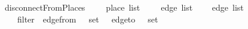 \ disconnectFromPlaces\ {\isacharcolon}{\isacharcolon}\ {\isachardoublequoteopen}{\isacharparenleft}\ \ \ place\ list\ {\isasymRightarrow}\ {\isacharparenleft}\ \ \ edge\ list\isanewline
{}\ {\isacharparenleft}\ \ \ edge\ list{\isachardoublequoteclose}\isanewline
\ \ \ {\isachardoublequoteopen}\ \ {\isacharequal}\isanewline
\ \ \ \ filter\ {\isacharparenleft}{\isasymlambda}\ edge{\isacharunderscore}from\ \ {\isasymnotin}\ set\ \ {\isasymand}\ edge{\isacharunderscore}to\ \ {\isasymnotin}\ set\ \ 
